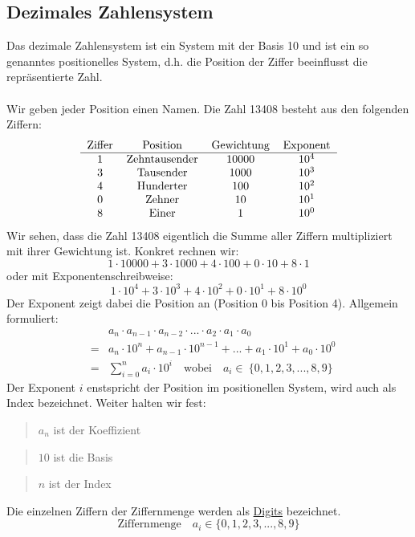 \documentclass{report}
\begin{document}
\subsection{Dezimales Zahlensystem}
Das dezimale Zahlensystem ist ein System mit der Basis 10 und ist ein so genanntes positionelles System, d.h. die Position der Ziffer beeinflusst die repräsentierte Zahl.
\\\\Wir geben jeder Position einen Namen. Die Zahl 13408 besteht aus den folgenden Ziffern:
\begin{equation}\begin{tabular}{c c c c}
Ziffer & Position & Gewichtung & Exponent \\
\hline
1 & Zehntausender & 10000 & $10^4$ \\
3 & Tausender &  1000 & $10^3$ \\
4 & Hunderter & 100 & $10^2$ \\
0 & Zehner & 10 & $10^1$ \\
8 & Einer & 1 & $10^0$ \\
\end{tabular}\end{equation}
Wir sehen, dass die Zahl 13408 eigentlich die Summe aller Ziffern multipliziert mit ihrer Gewichtung ist. Konkret rechnen wir:
\begin{equation}1 \cdot 10000 + 3 \cdot 1000 + 4 \cdot 100 + 0 \cdot 10 + 8 \cdot 1\end{equation}
oder mit Exponentenschreibweise:
\begin{equation}1 \cdot 10^4 + 3 \cdot 10^3 + 4 \cdot 10^2 + 0 \cdot 10^1 + 8 \cdot 10^0\end{equation}
Der Exponent zeigt dabei die Position an (Position 0 bis Position 4). Allgemein formuliert:
\begin{eqnarray}&&a_n \cdot a_{n-1} \cdot a_{n-2} \cdot ... \cdot a_2 \cdot a_1 \cdot a_0 \nonumber \\
&=&a_n \cdot 10^n + a_{n-1} \cdot 10^{n-1} + ... + a_1 \cdot 10^1 + a_0 \cdot 10^0 \nonumber \\
&=&\sum_{i=0}^{n} a_i \cdot 10^i \quad \mbox{wobei}\quad a_i \in\ \{0, 1, 2, 3, ..., 8, 9\}\end{eqnarray}
Der Exponent $i$ enstspricht der Position im positionellen System, wird auch als Index bezeichnet.
Weiter halten wir fest:
\begin{quote}$a_n$ ist der Koeffizient\end{quote}
\begin{quote}$10$ ist die Basis\end{quote}
\begin{quote}$n$ ist der Index\end{quote}
Die einzelnen Ziffern der Ziffernmenge werden als \underline{Digits} bezeichnet.
\begin{equation}\mbox{Ziffernmenge} \quad a_i \in \{0, 1, 2, 3, ..., 8, 9\}\end{equation}
\end{document}
